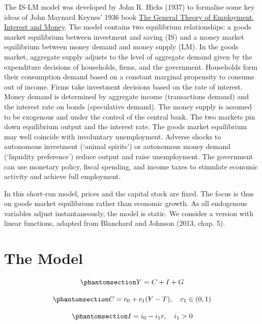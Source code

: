 \documentclass[
  letterpaper,
  DIV=11,
  numbers=noendperiod]{scrreprt}
\begin{document}
The IS-LM model was developed by John R. Hicks (1937) to formalise some
key ideas of John Maynard Keynes' 1936 book
\href{https://en.wikipedia.org/wiki/The_General_Theory_of_Employment,_Interest_and_Money}{The
General Theory of Employment, Interest and Money}. The model contains
two equilibrium relationships: a goods market equilibrium between
investment and saving (IS) and a money market equilibrium between money
demand and money supply (LM). In the goods market, aggregate supply
adjusts to the level of aggregate demand given by the expenditure
decisions of households, firms, and the government. Households form
their consumption demand based on a constant marginal propensity to
consume out of income. Firms take investment decisions based on the rate
of interest. Money demand is determined by aggregate income
(transactions demand) and the interest rate on bonds (speculative
demand). The money supply is assumed to be exogenous and under the
control of the central bank. The two markets pin down equilibrium output
and the interest rate. The goods market equilibrium may well coincide
with involuntary unemployment. Adverse shocks to autonomous investment
(`animal spirits') or autonomous money demand (`liquidity preference')
reduce output and raise unemployment. The government can use monetary
policy, fiscal spending, and income taxes to stimulate economic activity
and achieve full employment.

In this short-run model, prices and the capital stock are fixed. The
focus is thus on goods market equilibrium rather than economic growth.
As all endogenous variables adjust instantaneously, the model is static.
We consider a version with linear functions, adapted from Blanchard and
Johnson (2013, chap. 5).

\section{The Model}\label{the-model-1}

\begin{equation}\phantomsection\label{eq-islmY}{
Y=C+I+G
}\end{equation}

\begin{equation}\phantomsection\label{eq-islmC}{
C=c_{0}+c_{1}(Y-T), \quad c_{1} \in(0,1)
}\end{equation}

\begin{equation}\phantomsection\label{eq-islmI}{
I=i_{0}-i_{1} r, \quad i_{1}>0
}\end{equation}
\end{document}
